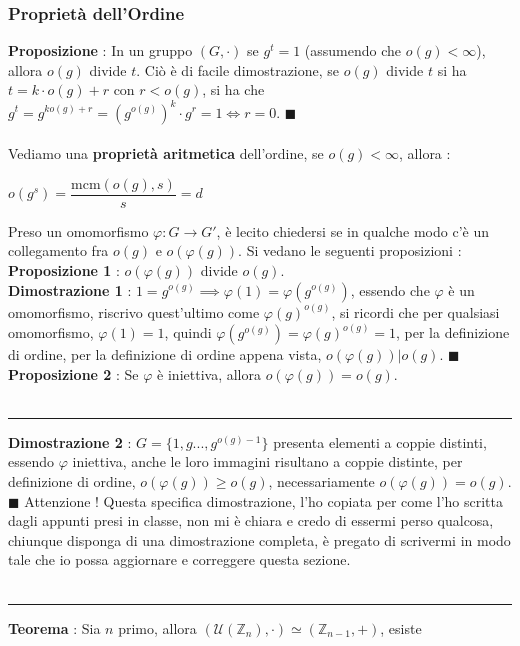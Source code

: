 \documentclass[12pt, letterpaper]{article}
\newcommand{\Z}{{\mathbb Z}}
\newcommand{\mcm}{{\text{mcm}}}
\begin{document}
\subsubsection{Proprietà dell'Ordine}
\textbf{Proposizione }: In un gruppo \((G,\cdot)\) se \(g^t=1\) (assumendo che \(o(g)<\infty\)),
allora \(o(g)\) divide \(t\). Ciò è di facile dimostrazione, 
se \(o(g)\) divide \(t\) si ha \(t=k\cdot o(g)+r\) con \(r<o(g)\), 
si ha che \(g^t=g^{ko(g)+r}=(g^{o(g)})^k\cdot g^r=1\iff r=0\). \(\blacksquare\)
\\\hphantom{}\\
Vediamo una \textbf{proprietà aritmetica} dell'ordine, se \(o(g)<\infty\), allora :
\begin{center}
    \(o(g^s)=\displaystyle\dfrac{\mcm(o(g),s)}{s}=d\)
\end{center}
Preso un omomorfismo \(\varphi : G\rightarrow G'\), è lecito chiedersi se in qualche 
modo c'è un collegamento fra \(o(g)\) e \(o(\varphi(g))\). Si vedano le seguenti 
proposizioni :\\
\textbf{Proposizione 1} : \(o(\varphi(g))\) divide \(o(g)\).\\
\textbf{Dimostrazione 1} : \(1=g^{o(g)}\implies \varphi(1)=\varphi(g^{o(g)})\), essendo 
che \(\varphi\) è un omomorfismo, riscrivo quest'ultimo come \(\varphi(g)^{o(g)}\), si ricordi 
che per qualsiasi omomorfismo, \(\varphi(1)=1\), quindi \(\varphi(g^{o(g)})=\varphi(g)^{o(g)}=1\),
per la definizione di ordine, per la definizione di ordine appena vista,  \(o(\varphi(g))|o(g)\). \(\blacksquare\)
\\\textbf{Proposizione 2} : Se \(\varphi\) è iniettiva, allora \(o(\varphi(g))=o(g)\).\\
\hphantom{}\\
\color{red}\hrule
\color{red} \textbf{Dimostrazione 2} : \color{black} \(G=\{1,g...,g^{o(g)-1}\}\) presenta elementi a coppie distinti, essendo 
\(\varphi\) iniettiva, anche le loro immagini risultano a coppie distinte, per definizione 
di ordine, \(o(\varphi(g))\ge o(g)\), necessariamente \(o(\varphi(g))=o(g)\). \(\blacksquare\)
\color{red} Attenzione ! Questa specifica dimostrazione, l'ho copiata per come l'ho scritta dagli 
appunti presi in classe, non mi è chiara e credo di essermi perso qualcosa, chiunque disponga di una 
dimostrazione completa, è pregato di scrivermi in modo tale che io possa aggiornare e correggere 
questa sezione.\\\hphantom{}\\
\hrule
\color{black}
\Large\textbf{Teorema } : \normalsize Sia \(n\) primo, allora \((\mathcal{U}(\Z_n),\cdot)\simeq (\Z_{n-1},+)\), esiste 
\end{document}
